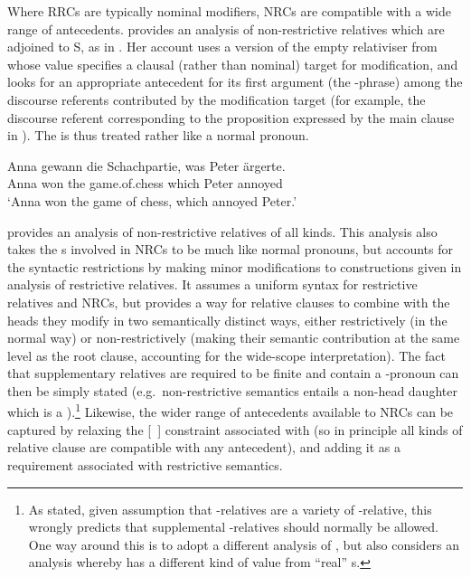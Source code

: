 \documentclass[output=paper,biblatex,babelshorthands,newtxmath,draftmode,colorlinks,citecolor=brown]{langscibook}
\begin{document}
\largerpage
Where RRCs are typically nominal modifiers, NRCs are compatible with a wide range of
antecedents. \citet{Holler:03} provides an analysis of  non-restrictive relatives which are adjoined to S, as
in . Her account uses a version of the empty relativiser from \citet{Pollard:Sag:94} whose
 value specifies a clausal (rather than nominal) target for modification, and
looks for an appropriate antecedent for its first
argument (the -phrase) among
the discourse referents contributed by the modification target (for example, the discourse
referent corresponding to the proposition expressed by the main clause in ).
The  is thus treated rather like a normal pronoun.
\begin{exe}\ex\label{x:rc-112}
 \gll Anna gewann die Schachpartie, was Peter ärgerte.\\
      Anna won the game.of.chess which Peter annoyed \\
\glt `Anna won the game of chess, which annoyed Peter.' 
\end{exe}

\citet{Arnold:04a} provides an analysis of  non-restrictive relatives of all kinds. This
analysis also takes the s involved in NRCs to be much like normal
pronouns, but accounts for the syntactic restrictions by making minor modifications to
constructions given in  analysis of restrictive relatives. It assumes a uniform
syntax for restrictive relatives and NRCs, but provides a way for relative clauses to combine with
the heads they modify in two semantically distinct ways, either restrictively (in the normal way) or
non-restrictively (making their semantic contribution at the same level as the root
clause, accounting for the wide-scope interpretation). The fact that supplementary
relatives are required to be finite and contain a -pronoun can then be simply
stated (e.g.\ non-restrictive semantics entails a non-head daughter which is a
).\footnote{As stated, given   assumption that
  -relatives are a variety of -relative, this wrongly predicts that
  supplemental -relatives should normally be allowed. One way around this is to
  adopt a different analysis of , but \citet{Arnold:04a} also considers an analysis whereby
   has a different kind of  value from ``real'' s.}
Likewise, the wider range of antecedents available to NRCs can be captured by relaxing the
[~] constraint associated with  (so in principle all
kinds of relative clause are compatible with any antecedent), and adding it as a requirement
associated with restrictive semantics.
 
\end{document}

